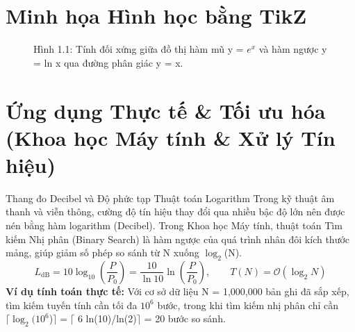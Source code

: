 \documentclass[11pt,a4paper,oneside]{book}
\begin{document}
\section{Minh họa Hình học bằng TikZ}
\begin{figure}[htbp]
\centering
{}
\caption{Hình 1.1: Tính đối xứng giữa đồ thị hàm mũ y = $e^x$ và hàm ngược y = ln x qua đường phân giác y = x.}
\label{fig:tikz-ch1-inverse}
\end{figure}

\section{Ứng dụng Thực tế \& Tối ưu hóa (Khoa học Máy tính \& Xử lý Tín hiệu)}
\begin{ungdung}{Thang đo Decibel và Độ phức tạp Thuật toán Logarithm}
Trong kỹ thuật âm thanh và viễn thông, cường độ tín hiệu thay đổi qua nhiều bậc độ lớn nên được nén bằng hàm logarithm (Decibel). Trong Khoa học Máy tính, thuật toán Tìm kiếm Nhị phân (Binary Search) là hàm ngược của quá trình nhân đôi kích thước mảng, giúp giảm số phép so sánh từ N xuống $\log_2$(N).
\[ L_{\text{dB}} = 10 \log_{10}\left(\frac{P}{P_0}\right) = \frac{10}{\ln 10} \ln\left(\frac{P}{P_0}\right), \qquad T(N) = \mathcal{O}(\log_2 N) \]
\noindent\textbf{Ví dụ tính toán thực tế:} Với cơ sở dữ liệu N = 1,000,000 bản ghi đã sắp xếp, tìm kiếm tuyến tính cần tối đa $10^6$ bước, trong khi tìm kiếm nhị phân chỉ cần $\lceil \log_2 (10^6$)$\rceil = \lceil$ 6 ln(10)/ln(2)$\rceil$  = 20 bước so sánh.
\end{ungdung}
\end{document}
